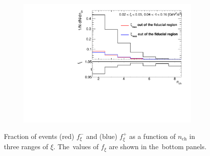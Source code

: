 \begin{figure}[b!]
\begin{subfigure}{.49\textwidth}
		\includegraphics[width=\textwidth,page=3]{chapters/chrgSTAR/img/xiMigration/xi.pdf}
	\end{subfigure}
	\hfill
	\begin{minipage}{.47\textwidth}
		\caption{Fraction of events (red) $f_{\xi}^-$ and (blue)  $f_{\xi}^+$ as a function of $n_\textrm{ch}$ in three ranges of $\xi$. The~values of $f_{\xi}$ are shown in the~bottom panels.}
		\label{fig:xi_correction_nch}
	\end{minipage}
	

\end{figure}
